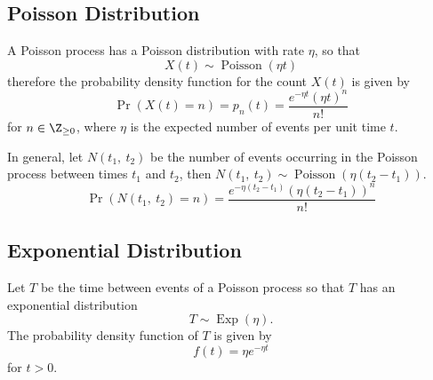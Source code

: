 \documentclass{article}
\begin{document}
\subsection{Poisson Distribution}
A Poisson process has a Poisson distribution with rate \(\eta\), so that
\begin{equation*}
    X\left( t \right) \sim \operatorname{Poisson}{\left( \eta t \right)}
\end{equation*}
therefore the probability density function for the count \(X\left( t \right)\) is given by
\begin{equation*}
    \Pr{\left( X\left( t \right) = n \right)} = p_n\left( t \right) = \frac{e^{-\eta t} \left( \eta t \right)^n}{n!}
\end{equation*}
for \(n \in \Z_{\geq 0}\), where \(\eta\) is the expected number of events per unit time \(t\).

In general, let \(N\left( t_1,\: t_2 \right)\) be the number of events occurring in the Poisson process between
times \(t_1\) and \(t_2\), then \(N\left( t_1,\: t_2 \right) \sim \operatorname{Poisson}{\left( \eta \left( t_2 - t_1 \right) \right)}\).
\begin{equation*}
    \Pr\left( N\left( t_1,\: t_2 \right) = n \right) = \frac{e^{-\eta \left( t_2 - t_1 \right)} \left( \eta \left( t_2 - t_1 \right) \right)^n}{n!}
\end{equation*}
\subsection{Exponential Distribution}
Let \(T\) be the time between events of a Poisson process so that \(T\) has an exponential distribution
\begin{equation*}
    T \sim \operatorname{Exp}{\left( \eta \right)}.
\end{equation*}
The probability density function of \(T\) is given by
\begin{equation*}
    f\left( t \right) = \eta e^{-\eta t}
\end{equation*}
for \(t > 0\).
\end{document}
